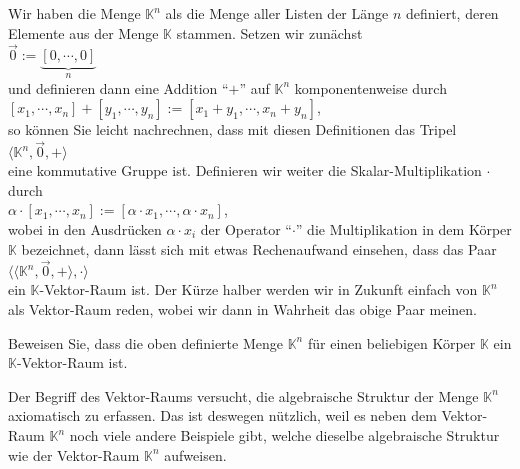 \example
Wir haben die Menge $\mathbb{K}^n$ als die Menge aller Listen der L\"{a}nge $n$ definiert, deren Elemente aus der Menge $\mathbb{K}$ stammen.
Setzen wir zun\"{a}chst
\\[0.2cm]
\hspace*{1.3cm}
$\vec{0} := \underbrace{[0, \cdots, 0]}_n$ 
\\[0.2cm]
und definieren dann eine Addition ``$+$'' auf $\mathbb{K}^n$ komponentenweise durch
\\[0.2cm]
\hspace*{1.3cm}
$[x_1, \cdots, x_n] + [y_1, \cdots, y_n] := [x_1 + y_1, \cdots, x_n + y_n]$,
\\[0.2cm]
so k\"{o}nnen Sie leicht nachrechnen, dass mit diesen Definitionen das Tripel
\\[0.2cm]
\hspace*{1.3cm}
$\langle \mathbb{K}^n, \vec{0}, +\rangle$
\\[0.2cm]
eine kommutative Gruppe ist.  Definieren wir weiter die Skalar-Multiplikation $\cdot$ durch
\\[0.2cm]
\hspace*{1.3cm}
$\alpha \cdot [x_1, \cdots, x_n] := [\alpha \cdot x_1, \cdots, \alpha \cdot x_n]$,
\\[0.2cm]
wobei in den Ausdr\"{u}cken $\alpha \cdot x_i$ der Operator ``$\cdot$'' die Multiplikation in dem K\"{o}rper $\mathbb{K}$ bezeichnet,
dann l\"{a}sst sich mit etwas Rechenaufwand einsehen, dass das Paar
\\[0.2cm]
\hspace*{1.3cm}
$\bigl\langle \langle \mathbb{K}^n, \vec{0}, + \rangle, \cdot \bigr\rangle$ 
\\[0.2cm]
ein $\mathbb{K}$-Vektor-Raum ist.  Der K\"{u}rze halber werden wir in Zukunft einfach von $\mathbb{K}^n$ als Vektor-Raum reden, wobei wir dann in Wahrheit das obige Paar meinen. 
\eox

\exercise
Beweisen Sie, dass die oben definierte Menge $\mathbb{K}^n$ f\"{u}r einen beliebigen K\"{o}rper
$\mathbb{K}$ ein $\mathbb{K}$-Vektor-Raum ist. \eox 


Der Begriff des Vektor-Raums versucht, die algebraische Struktur der Menge $\mathbb{K}^n$
axiomatisch zu erfassen.  Das ist deswegen n\"{u}tzlich, weil es neben dem Vektor-Raum 
$\mathbb{K}^n$ noch viele andere Beispiele gibt, welche dieselbe algebraische
Struktur wie der Vektor-Raum $\mathbb{K}^n$ aufweisen.  


